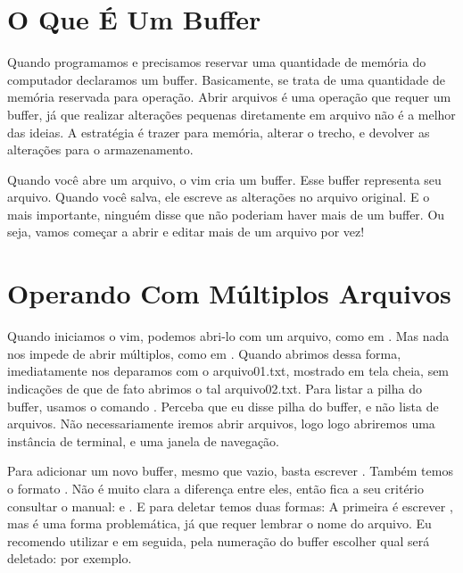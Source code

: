 \section{O Que É Um Buffer}
Quando programamos e precisamos reservar uma quantidade de memória do computador declaramos um buffer.
Basicamente, se trata de uma quantidade de memória reservada para operação.
Abrir arquivos é uma operação que requer um buffer, já que realizar alterações pequenas diretamente em arquivo
não é a melhor das ideias.
A estratégia é trazer para memória, alterar o trecho, e devolver as alterações para o armazenamento.

Quando você abre um arquivo, o vim cria um buffer.
Esse buffer representa seu arquivo.
Quando você salva, ele escreve as alterações no arquivo original.
E o mais importante, ninguém disse que não poderiam haver mais de um buffer.
Ou seja, vamos começar a abrir e editar mais de um arquivo por vez!

\section{Operando Com Múltiplos Arquivos}
Quando iniciamos o vim, podemos abri-lo com um arquivo, como em .
Mas nada nos impede de abrir múltiplos, como em .
Quando abrimos dessa forma, imediatamente nos deparamos com o arquivo01.txt, mostrado em tela cheia,
sem indicações de que de fato abrimos o tal arquivo02.txt.
Para listar a pilha do buffer, usamos o comando .
Perceba que eu disse pilha do buffer, e não lista de arquivos.
Não necessariamente iremos abrir arquivos, logo logo abriremos uma instância de terminal, e uma janela de navegação.


Para adicionar um novo buffer, mesmo que vazio, basta escrever \newline
{}.
Também temos o formato .
Não é muito clara a diferença entre eles, então fica a seu critério consultar o manual:  e .
E para deletar temos duas formas: A primeira é escrever , mas
é uma forma problemática, já que requer lembrar o nome do arquivo.
Eu recomendo utilizar  e em seguida, pela numeração do buffer escolher qual será deletado:
 por exemplo.

